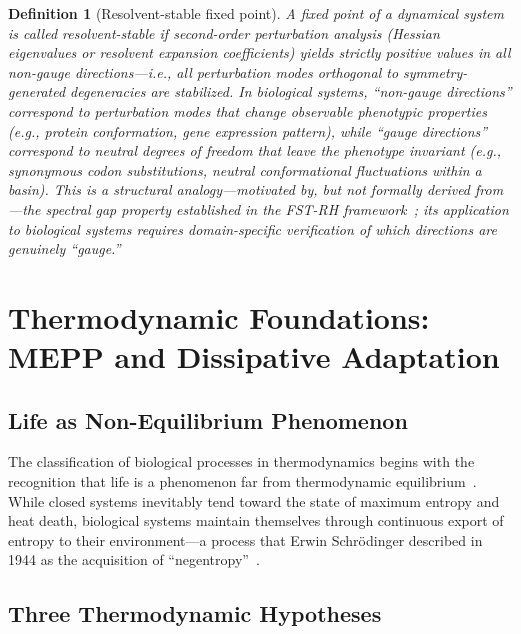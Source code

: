 \documentclass[12pt,a4paper]{article}
\newtheorem{definition}{Definition}
\theoremstyle{remark}
\begin{document}
\begin{definition}[Resolvent-stable fixed point]
\label{def:resolvent-stable}
A fixed point of a dynamical system is called \emph{resolvent-stable} if second-order perturbation analysis (Hessian eigenvalues or resolvent expansion coefficients) yields strictly positive values in all non-gauge directions---i.e., all perturbation modes orthogonal to symmetry-generated degeneracies are stabilized. In biological systems, ``non-gauge directions'' correspond to perturbation modes that change observable phenotypic properties (e.g., protein conformation, gene expression pattern), while ``gauge directions'' correspond to neutral degrees of freedom that leave the phenotype invariant (e.g., synonymous codon substitutions, neutral conformational fluctuations within a basin). This is a structural analogy---motivated by, but not formally derived from---the spectral gap property established in the FST-RH framework~\citep{GeigerRH2026b}; its application to biological systems requires domain-specific verification of which directions are genuinely ``gauge.''
\end{definition}

\section{Thermodynamic Foundations: MEPP and Dissipative Adaptation}
\label{sec:thermodynamics}

\subsection{Life as Non-Equilibrium Phenomenon}

The classification of biological processes in thermodynamics begins with the recognition that life is a phenomenon far from thermodynamic equilibrium~\citep{EcosystemMEPP}. While closed systems inevitably tend toward the state of maximum entropy and heat death, biological systems maintain themselves through continuous export of entropy to their environment---a process that Erwin Schrödinger described in 1944 as the acquisition of ``negentropy''~\citep{SchoolBiologicalPhysics,EcosystemMEPP,Kuzu2025}.

\subsection{Three Thermodynamic Hypotheses}
\end{document}
